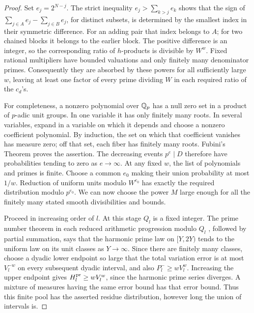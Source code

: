 \begin{proof}
Set \(e_j=2^{N-j}\).  The strict inequality
\(e_j>\sum_{k>j}e_k\) shows that the sign of
\(\sum_{j\in A}e_j-\sum_{j\in B}e_j\), for distinct subsets, is
determined by the smallest index in their symmetric difference.
For an adding pair that index belongs to \(A\); for two chained
blocks it belongs to the earlier block.  The positive difference is
an integer, so the corresponding ratio of \(h\)-products is divisible
by \(W^w\).  Fixed rational multipliers have bounded valuations and
only finitely many denominator primes.  Consequently they are absorbed
by these powers for all sufficiently large \(w\), leaving at least
one factor of every prime dividing \(W\) in each required ratio of
the \(c_d\)'s.

For completeness, a nonzero polynomial over \(\mathbb Q_p\) has a null zero
set in a product of \(p\)-adic unit groups.  In one variable it has
only finitely many roots.  In several variables, expand in a variable
on which it depends and choose a nonzero coefficient polynomial.
By induction, the set on which that coefficient vanishes has measure
zero; off that set, each fiber has finitely many roots.  Fubini's
Theorem proves the assertion.  The decreasing events
\(p^e\mid D\) therefore have probabilities tending to zero as
\(e\to\infty\).  At any fixed \(w\), the list of polynomials and
primes is finite.  Choose a common \(e_0\) making their union
probability at most \(1/w\).  Reduction of uniform units modulo
\(W^{e_0}\) has exactly the required distribution modulo
\(p^{e_0}\).  We can now choose the power \(M\) large enough for
all the finitely many stated smooth divisibilities and bounds.

Proceed in increasing order of \(l\).  At this stage \(Q_l\) is a
fixed integer.  The prime number theorem in each reduced arithmetic
progression modulo \(Q_l\) \cite[Equation~(1.1)]{SelbergAP}, followed by partial summation, says that
the harmonic prime law on \([Y,2Y)\) tends to the uniform law on
its unit classes as \(Y\to\infty\).  Since there are finitely many
classes, choose a dyadic lower endpoint so large that the total
variation error is at most \(V_l^{-w}\) on every subsequent dyadic
interval, and also \(P_l^-\ge wV_l^w\).  Increasing the upper
endpoint gives \(H_l^{\rm pr}\ge wV_l^w\), since the harmonic prime
series diverges.  A mixture of measures having the same error bound
has that error bound.  Thus this finite pool has the asserted
residue distribution, however long the union of intervals is.


\end{proof}
